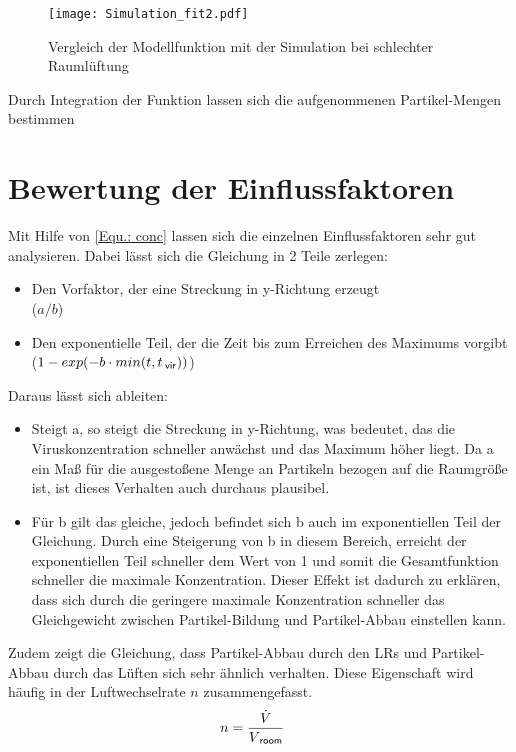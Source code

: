 \documentclass[12pt,a4paper,bibtotocnumbered,liststotocnumbered]{scrreprt}
\begin{document}
\begin{figure}[H]
\begin{center}
\texttt{[image: Simulation\_fit2.pdf]}
\caption{Vergleich der Modellfunktion mit der Simulation bei schlechter Raumlüftung}
\label{Abb: Modell schlecht}
\end{center}
\end{figure}

Durch Integration der Funktion lassen sich die aufgenommenen Partikel-Mengen bestimmen


\section{Bewertung der Einflussfaktoren}
Mit Hilfe von \autoref{Equ.: conc} lassen sich die einzelnen Einflussfaktoren sehr gut analysieren. Dabei lässt sich die Gleichung in 2 Teile zerlegen:
\begin{itemize}
\item Den Vorfaktor, der eine Streckung in y-Richtung erzeugt \\ ($a/b$)
\item Den exponentielle Teil, der die Zeit bis zum Erreichen des Maximums vorgibt \\ ($1 - exp(-b\cdot min(t,t_{\: \mathsf{vir}}))$)
\end{itemize}
Daraus lässt sich ableiten:
\begin{itemize}
\item Steigt a, so steigt die Streckung in y-Richtung, was bedeutet, das die Viruskonzentration schneller anwächst und das Maximum höher liegt. Da a ein Maß für die ausgestoßene Menge an Partikeln bezogen auf die Raumgröße ist, ist dieses Verhalten auch durchaus plausibel.
\item Für b gilt das gleiche, jedoch befindet sich b auch im exponentiellen Teil der Gleichung. Durch eine Steigerung von b in diesem Bereich, erreicht der exponentiellen Teil schneller dem Wert von 1 und somit die Gesamtfunktion schneller die maximale Konzentration. Dieser Effekt ist dadurch zu erklären, dass sich durch die geringere maximale Konzentration schneller das Gleichgewicht zwischen Partikel-Bildung und Partikel-Abbau einstellen kann.
\end{itemize}
Zudem zeigt die Gleichung, dass Partikel-Abbau durch den \acp{LR} und Partikel-Abbau durch das Lüften sich sehr ähnlich verhalten. Diese Eigenschaft wird häufig in der Luftwechselrate $n$ zusammengefasst.
\begin{align}
n &=  \frac{\dot{V}}{V_{\: \mathsf{room}}}
\end{align}
\end{document}
